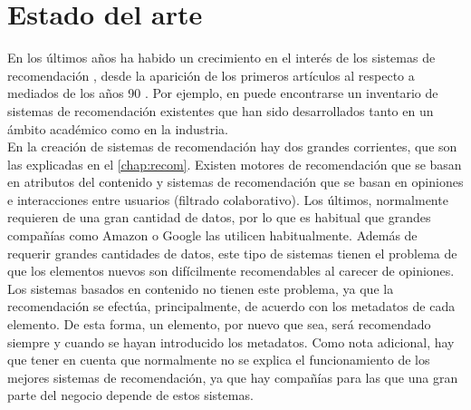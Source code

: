 \section{Estado del arte}\label{sec:soa}

En los últimos años ha habido un crecimiento en el interés de los sistemas de recomendación \cite{Abdomavicius}, desde la aparición de los primeros artículos al respecto a mediados de los años 90 \cite{resnick}. Por ejemplo, en \cite{nageswara} puede encontrarse un inventario de sistemas de recomendación existentes que han sido desarrollados tanto en un ámbito académico como en la industria.\\

En la creación de sistemas de recomendación hay dos grandes corrientes, que son las explicadas en el \autoref{chap:recom}. Existen motores de recomendación que se basan en atributos del contenido y sistemas de recomendación que se basan en opiniones e interacciones entre usuarios (filtrado colaborativo). Los últimos, normalmente requieren de una gran cantidad de datos, por lo que es habitual que grandes compañías como Amazon \cite{Amazon} o Google \cite{Google} las utilicen habitualmente. Además de requerir grandes cantidades de datos, este tipo de sistemas tienen el problema de que los elementos nuevos son difícilmente recomendables al carecer de opiniones. Los sistemas basados en contenido no tienen este problema, ya que la recomendación se efectúa, principalmente, de acuerdo con los metadatos de cada elemento. De esta forma, un elemento, por nuevo que sea, será recomendado siempre y cuando se hayan introducido los metadatos. Como nota adicional, hay que tener en cuenta que normalmente no se explica el funcionamiento de los mejores sistemas de recomendación, ya que hay compañías para las que una gran parte del negocio depende de estos sistemas.\\

